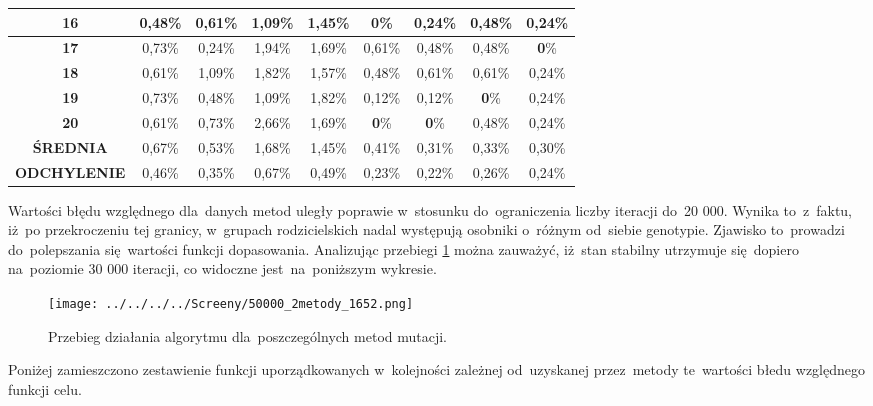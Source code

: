 \begin{itemize}
\begin{table}[h!]
\begin{center}
{\begin{tabular}{|c|c|c|c|c|c|c|c|c|}
\textbf{16}&0,48\%&0,61\%&1,09\%&1,45\%&\color{green}\textbf{0}\%&0,24\%&0,48\%&0,24\% \\ \hline
\textbf{17}&0,73\%&0,24\%&1,94\%&1,69\%&0,61\%&0,48\%&0,48\%&\color{green}\textbf{0}\% \\ \hline
\textbf{18}&0,61\%&1,09\%&1,82\%&1,57\%&0,48\%&0,61\%&0,61\%&0,24\% \\ \hline
\textbf{19}&0,73\%&0,48\%&1,09\%&1,82\%&0,12\%&0,12\%&\color{green}\textbf{0}\%&0,24\% \\ \hline
\textbf{20}&0,61\%&0,73\%&2,66\%&1,69\%&\color{green}\textbf{0}\%&\color{green}\textbf{0}\%&0,48\%&0,24\% \\ \hline
\textbf{ŚREDNIA}&0,67\%&0,53\%&1,68\%&1,45\%&0,41\%&0,31\%&0,33\%&0,30\% \\ \hline
\textbf{ODCHYLENIE}&0,46\%&0,35\%&0,67\%&0,49\%&0,23\%&0,22\%&0,26\%&0,24\% \\ \hline
\end{tabular}}
\label{rankingowa50}
\end{center}
\end{table}
\par

Wartości błędu względnego dla~danych metod uległy poprawie w~stosunku do~ograniczenia liczby iteracji do~20 000. Wynika to~z~faktu, iż~po przekroczeniu tej granicy, w~grupach rodzicielskich nadal występują osobniki o~różnym od~siebie genotypie. Zjawisko to~prowadzi do~polepszania się~wartości funkcji dopasowania. Analizując przebiegi \ref{rankingowa50pic} można zauważyć, iż~stan stabilny utrzymuje się~dopiero na~poziomie 30 000 iteracji, co widoczne jest~na~poniższym wykresie.

\begin{figure}[h!]
		\texttt{[image: ../../../../Screeny/50000\_2metody\_1652.png]}
		\caption{Przebieg działania algorytmu dla~poszczególnych metod mutacji.}
		\label{rankingowa50pic}			
\end{figure}

Poniżej zamieszczono zestawienie funkcji uporządkowanych w~kolejności zależnej od~uzyskanej przez~metody te~wartości błedu względnego funkcji celu.


\end{itemize}
